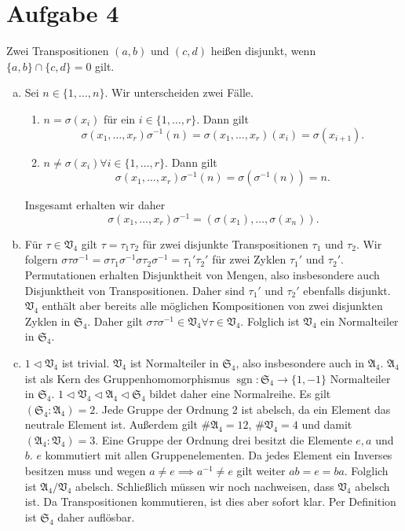 \documentclass{article}
\begin{document}
\section*{Aufgabe 4}
\begin{definition}
    Zwei Transpositionen $(a,b)$ und $(c,d)$ heißen disjunkt, wenn $\{a,b\} \cap \{c,d\} = 0$ gilt.
\end{definition}
\begin{enumerate}[(a)]
    \item Sei $n \in \{1, \dots, n\}$. Wir unterscheiden zwei Fälle.
    \begin{enumerate}[(1)]
        \item $n = \sigma(x_i)$ für ein $i \in \{1, \dots, r\}$. Dann gilt
        \[
            \sigma(x_1, \dots, x_r) \sigma^{-1}(n) = \sigma(x_1, \dots, x_r)(x_i) = \sigma(x_{i+1}).  
        \]
        \item $n \neq \sigma(x_i) \forall i \in \{1, \dots, r\}$. Dann gilt
        \[
            \sigma(x_1, \dots, x_r) \sigma^{-1}(n) = \sigma(\sigma^{-1}(n)) = n.
        \]
    \end{enumerate}
    Insgesamt erhalten wir daher
    \[
        \sigma(x_1, \dots, x_r) \sigma^{-1} = (\sigma(x_1), \dots, \sigma(x_n)).
    \]
    \item Für $\tau \in \mathfrak{V}_4$ gilt $\tau = \tau_1 \tau_2$ für zwei disjunkte Transpositionen $\tau_1$ und $\tau_2$.
    Wir folgern $\sigma \tau \sigma^{-1} = \sigma \tau_1 \sigma^{-1}\sigma \tau_2 \sigma^{-1} = \tau_1' \tau_2'$ für zwei Zyklen $\tau_1'$ und $\tau_2'$.
    Permutationen erhalten Disjunktheit von Mengen, also insbesondere auch Disjunktheit von Transpositionen.
    Daher sind $\tau_1'$ und $\tau_2'$ ebenfalls disjunkt.
    $\mathfrak{V}_4$ enthält aber bereits alle möglichen Kompositionen von zwei disjunkten Zyklen in $\mathfrak{S}_4$.
    Daher gilt $\sigma \tau \sigma^{-1} \in \mathfrak{V}_4 \forall \tau \in \mathfrak{V}_4$.
    Folglich ist $\mathfrak{V}_4$ ein Normalteiler in $\mathfrak{S}_4$.
    \item $1 \triangleleft \mathfrak{V}_4$ ist trivial. $\mathfrak{V}_4$ ist Normalteiler in $\mathfrak{S}_4$,
    also insbesondere auch in $\mathfrak{A}_4$.
    $\mathfrak{A}_4$ ist als Kern des Gruppenhomomorphismus $\operatorname{sgn} \colon \mathfrak{S}_4 \to \{1, -1\}$ Normalteiler in $\mathfrak{S}_4$.
    $1 \triangleleft \mathfrak{V}_4 \triangleleft \mathfrak{A}_4 \triangleleft \mathfrak{S}_4$ bildet daher eine Normalreihe.
    Es gilt $(\mathfrak{S}_4 : \mathfrak{A}_4) = 2$. Jede Gruppe der Ordnung $2$ ist abelsch, da ein Element das neutrale Element ist.
    Außerdem gilt $\# \mathfrak{A}_4 = 12$, $\# \mathfrak{V}_4 = 4$ und damit $(\mathfrak{A}_4 \colon \mathfrak{V}_4) = 3$.
    Eine Gruppe der Ordnung drei besitzt die Elemente $e, a$ und $b$. $e$ kommutiert mit allen Gruppenelementen.
    Da jedes Element ein Inverses besitzen muss und wegen $a \neq e \implies a^{-1} \neq e$ gilt weiter $ab = e = ba$.
    Folglich ist $\mathfrak{A}_4 /\mathfrak{V}_4$ abelsch.
    Schließlich müssen wir noch nachweisen, dass $\mathfrak{V}_4$ abelsch ist. 
    Da Transpositionen kommutieren, ist dies aber sofort klar.
    Per Definition ist $\mathfrak{S}_4$ daher auflösbar.
\end{enumerate}
\end{document}
